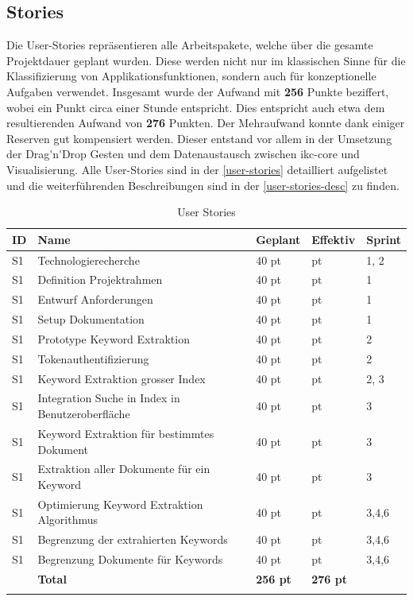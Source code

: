 \subsection{Stories}
Die User-Stories repräsentieren alle Arbeitspakete, welche über die gesamte Projektdauer geplant wurden. Diese werden nicht nur im klassischen Sinne für die Klassifizierung von Applikationsfunktionen, sondern auch für konzeptionelle Aufgaben verwendet. Insgesamt wurde der Aufwand mit \textbf{256} Punkte beziffert, wobei ein Punkt circa einer Stunde entspricht. Dies entspricht auch etwa dem resultierenden Aufwand von \textbf{276} Punkten. Der Mehraufwand konnte dank einiger Reserven gut kompensiert werden. Dieser entstand vor allem in der Umsetzung der \gls{Drag'n'Drop} Gesten und dem Datenaustausch zwischen \gls{ikc-core} und Visualisierung. Alle User-Stories sind in der \autoref{user-stories} detailliert aufgelistet und die weiterführenden Beschreibungen sind in der \autoref{user-stories-desc} zu finden.
\begin{longtable}{|p{0.6cm}|P{4.5cm}|p{1.4cm}|p{1.4cm}|p{2.4cm}|}
\hline
ID  & Name & Geplant & Effektiv &Sprint\\ \hline
S1 & Technologierecherche           & 40 pt             &  pt              & 1, 2 \\ \hline
S1 & Definition Projektrahmen           & 40 pt             &  pt              & 1  \\ \hline
S1 & Entwurf Anforderungen           & 40 pt             &  pt              & 1 \\ \hline
S1 & Setup Dokumentation           & 40 pt             &  pt              & 1 \\ \hline
S1 & Prototype Keyword Extraktion            & 40 pt             &  pt              & 2 \\ \hline
S1 & Tokenauthentifizierung           & 40 pt             &  pt              & 2 \\ \hline
S1 & Keyword Extraktion grosser Index          & 40 pt             &  pt              & 2, 3 \\ \hline
S1 & Integration Suche in Index in Benutzeroberfläche           & 40 pt             &  pt              & 3 \\ \hline
S1 & Keyword Extraktion für bestimmtes Dokument         & 40 pt             &  pt              & 3 \\ \hline
S1 & Extraktion aller Dokumente für ein Keyword       & 40 pt             &  pt              & 3 \\ \hline
S1 & Optimierung Keyword Extraktion Algorithmus    & 40 pt             &  pt              & 3,4,6 \\ \hline
S1 & Begrenzung der extrahierten Keywords    & 40 pt             &  pt              & 3,4,6 \\ \hline
S1 & Begrenzung Dokumente für Keywords    & 40 pt             &  pt              & 3,4,6 \\ \hline
\hline
 & \textbf{Total}                       & \textbf{256 pt}& \textbf{276 pt}&   \\\hline
    \caption{User Stories}
 \label{user-stories}
\end{longtable}

